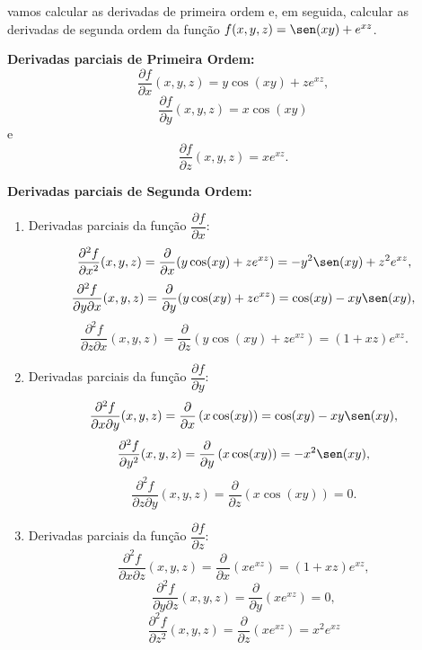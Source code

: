 \begin{example}{}{}
vamos calcular as derivadas de primeira ordem e, em seguida, calcular as derivadas de segunda ordem da função \(f(x, y, z) = \sen(xy) + e^{xz} \).

\textbf{Derivadas parciais de Primeira Ordem:}
   \[\dfrac{\partial f}{\partial x} (x,y,z)= y\cos(xy) + ze^{xz},\]
   \[ \dfrac{\partial f}{\partial y} (x,y,z) = x\cos(xy) \]
e
   \[ \dfrac{\partial f}{\partial z}(x,y,z) = x e^{xz} .\]

\textbf{Derivadas parciais de Segunda Ordem:}\medskip
\begin{enumerate}
    \item 
Derivadas parciais da função $\dfrac{\partial f}{\partial x}$:
\[\dfrac{\partial^2 f}{\partial x^2}(x,y,z) = \dfrac{\partial}{\partial x}(y\cos(xy) + ze^{xz}) = -y^2\sen(xy) + z^2e^{xz},\]
\[\dfrac{\partial^2 f}{\partial y \partial x} (x,y,z)= \dfrac{\partial}{\partial y}(y\cos(xy) + ze^{xz}) = \cos (xy)-xy\sen(xy), \]
\[\dfrac{\partial^2 f}{\partial z \partial x}(x,y,z) = \dfrac{\partial}{\partial z}(y\cos(xy) + ze^{xz}) = (1+xz)e^{xz}.\]


\item Derivadas parciais da função $\dfrac{\partial f}{\partial y}$:
\[\dfrac{\partial^2 f}{\partial x \partial y} (x,y,z)= \dfrac{\partial}{\partial x}\left(x\cos(xy) \right) = \cos(xy) - {xy\sen(xy)},\]
\[\dfrac{\partial^2 f}{\partial y^2} (x,y,z)= \dfrac{\partial}{\partial y}\left(x\cos(xy) \right) = -x^2\sen(xy), \]
\[\dfrac{\partial^2 f}{\partial z \partial y} (x,y,z)= \dfrac{\partial}{\partial z}\left(x\cos(xy) \right) = 0.\] 
\medskip

\item Derivadas parciais da função $\dfrac{\partial f}{\partial z}$:
\[\dfrac{\partial^2 f}{\partial x \partial z}(x,y,z) = \dfrac{\partial}{\partial x}\left(xe^{xz} \right) = (1+xz)e^{xz},\]
\[\dfrac{\partial^2 f}{\partial y \partial z}(x,y,z) = \dfrac{\partial}{\partial y}\left(xe^{xz} \right) = 0,\] 
\[\dfrac{\partial^2 f}{\partial z^2} (x,y,z)= \dfrac{\partial}{\partial z}\left(xe^{xz} \right) = x^2e^{xz} \]
\end{enumerate}

\end{example}





